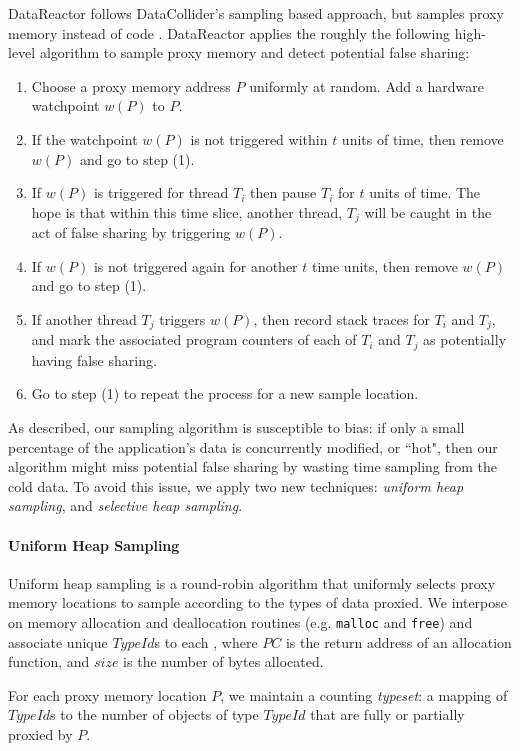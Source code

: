 \documentclass{sig-alternate}
\newcommand{\Toolname}{DataReactor}
\begin{document}
\Toolname{} follows DataCollider's sampling based approach, but samples proxy memory instead of code \cite{DataCollider}.
\Toolname{} applies the roughly the following high-level algorithm to sample proxy memory and detect potential false sharing:
\begin{enumerate}
\item Choose a proxy memory address $P$ uniformly at random. Add a hardware watchpoint $w(P)$ to $P$.
\item If the watchpoint $w(P)$ is not triggered within $t$ units of time, then remove $w(P)$ and go to step (1).
\item If $w(P)$ is triggered for thread $T_i$ then pause $T_i$ for $t$ units of time. The hope is that within this
time slice, another thread, $T_j$ will be caught in the act of false sharing by triggering $w(P)$.
\item If $w(P)$ is not triggered again for another $t$ time units, then remove $w(P)$ and go to step (1).
\item If another thread $T_j$ triggers $w(P)$, then record stack traces for $T_i$ and $T_j$, and mark the associated program
counters of each of $T_i$ and $T_j$ as potentially having false sharing.
\item Go to step (1) to repeat the process for a new sample location.
\end{enumerate}

As described, our sampling algorithm is susceptible to bias: if only a small percentage of the application's data is concurrently
modified, or ``hot", then our algorithm might miss potential false sharing by wasting time sampling from the cold data.
To avoid this issue, we apply two new techniques: \emph{uniform heap sampling}, and \emph{selective heap sampling}.


\newcommand\TypeId{$TypeId$}

\paragraph{Uniform Heap Sampling}
Uniform heap sampling is a round-robin algorithm that uniformly selects proxy memory locations to sample according to
the types of data proxied. We interpose on memory allocation and deallocation routines (e.g. \texttt{malloc} and \texttt{free})
and associate unique \TypeId{}s to each \TypeIdPair{}, where $PC$ is the return address of an allocation function, and $size$ is the
number of bytes allocated.

For each proxy memory location $P$, we maintain a counting \emph{typeset}: a mapping of \TypeId{}s to the number of objects of type
\TypeId{} that are fully or partially proxied by $P$.
\end{document}
